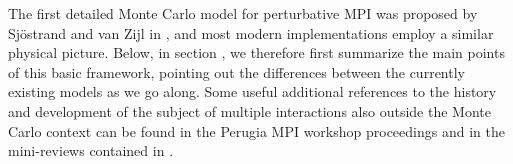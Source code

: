 The first detailed Monte Carlo model for 
perturbative MPI was proposed by Sj\"ostrand and van Zijl in 
\cite{Sjostrand:1987su}, and most modern implementations employ a
similar physical picture. Below, in section , 
we therefore first summarize the main points of this basic framework,  
pointing out the differences between the currently existing models 
as we go along. 
Some useful additional references to the history and development of
 the subject of  multiple interactions also outside the Monte Carlo context 
can be found in the Perugia MPI workshop
 proceedings \cite{Bartalini:2010su} and in the mini-reviews contained
 in \cite{Sjostrand:2004pf,Gustafson:2007sb}.


